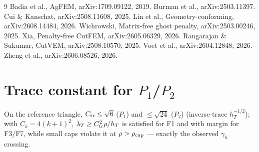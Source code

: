 \documentclass[11pt]{article}
\theoremstyle{definition}
\begin{document}
\begin{thebibliography}{9}
 Badia et al., AgFEM, arXiv:1709.09122, 2019.
 Burman et al., arXiv:2503.11397.
 Cui \& Kanschat, arXiv:2508.11608, 2025.
 Lin et al., Geometry-conforming, arXiv:2608.14484, 2026.
 Wichrowski, Matrix-free ghost penalty, arXiv:2503.00246, 2025.
 Xia, Penalty-free CutFEM, arXiv:2605.06329, 2026.
 Rangarajan \& Sukumar, CutVEM, arXiv:2508.10570, 2025.
 Voet et al., arXiv:2604.12848, 2026.
 Zheng et al., arXiv:2606.08526, 2026.
\end{thebibliography}

\appendix
\section{Trace constant for $P_1$/$P_2$}
On the reference triangle, $C_{\rm tr}\le\sqrt6$ ($P_1$) and
$\le\sqrt{24}$ ($P_2$) (inverse-trace $h_T^{-1/2}$); with $C_k=4(k+1)^2$,
$\lambda_T\ge C_{\rm tr}^2\rho/h_T$ is satisfied for F1 and with margin for
F3/F7, while small caps violate it at $\rho>\rho_{\rm cap}$ — exactly the
observed $\gamma_h$ crossing.
\end{document}
